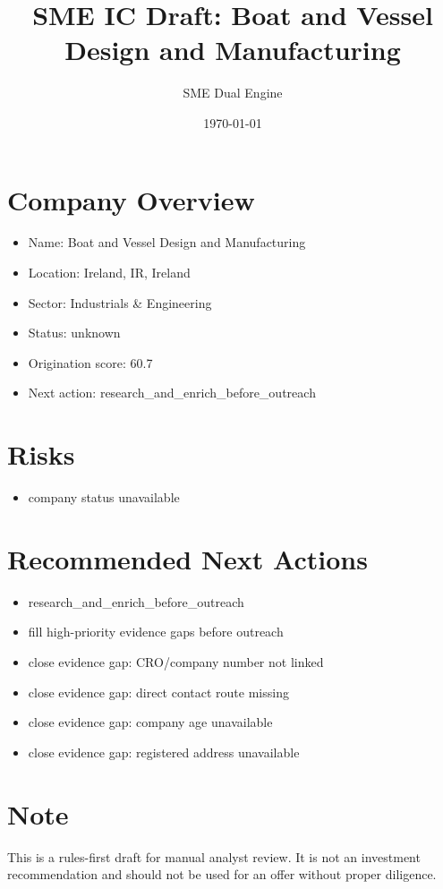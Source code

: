 \documentclass[11pt,a4paper]{article}
\title{SME IC Draft: Boat and Vessel Design and Manufacturing}
\author{SME Dual Engine}
\date{\today}
\begin{document}
\maketitle
\section*{Company Overview}
\begin{itemize}[leftmargin=1.4em]
\item Name: Boat and Vessel Design and Manufacturing
\item Location: Ireland, IR, Ireland
\item Sector: Industrials \& Engineering
\item Status: unknown
\item Origination score: 60.7
\item Next action: research\_and\_enrich\_before\_outreach
\end{itemize}
\section*{Risks}
\begin{itemize}[leftmargin=1.4em]
\item company status unavailable
\end{itemize}
\section*{Recommended Next Actions}
\begin{itemize}[leftmargin=1.4em]
\item research\_and\_enrich\_before\_outreach
\item fill high-priority evidence gaps before outreach
\item close evidence gap: CRO/company number not linked
\item close evidence gap: direct contact route missing
\item close evidence gap: company age unavailable
\item close evidence gap: registered address unavailable
\end{itemize}
\section*{Note}
This is a rules-first draft for manual analyst review. It is not an investment
recommendation and should not be used for an offer without proper diligence.
\end{document}
